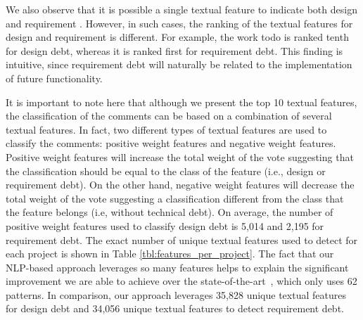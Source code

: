 We also observe that it is possible a single textual feature to indicate both design and requirement \SATD. However, in such cases, the ranking of the textual features for design and requirement \SATD is different. For example, the work todo is ranked tenth for design debt, whereas it is ranked first for requirement debt. This finding is intuitive, since requirement debt will naturally be related to the implementation of future functionality.

It is important to note here that although we present the top 10 textual features, the classification of the comments can be based on a combination of several textual features. In fact, two different types of textual features are used to classify the comments: positive weight features and negative weight features. Positive weight features will increase the total weight of the vote suggesting that the classification should be equal to the class of the feature (i.e., design or requirement debt). On the other hand, negative weight features will decrease the total weight of the vote suggesting a classification different from the class that the feature belongs (i.e, without technical debt). On average, the number of positive weight features used to classify design debt is 5,014 and 2,195 for requirement debt. The exact number of unique textual features used to detect \SATD for each project is shown in Table \ref{tbl:features_per_project}. The fact that our NLP-based approach leverages so many features helps to explain the significant improvement we are able to achieve over the state-of-the-art~\cite{Potdar2014ICSME}, which only uses 62 patterns. In comparison, our approach leverages 35,828 unique textual features for design debt and 34,056 unique textual features to detect requirement debt.


